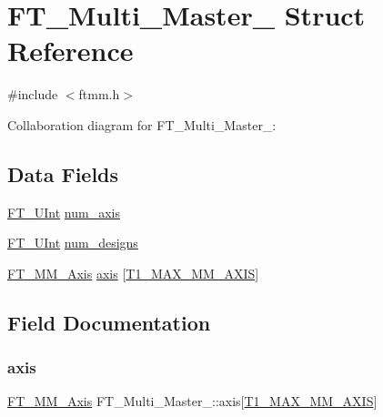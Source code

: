 \hypertarget{struct_f_t___multi___master__}{}\section{F\+T\+\_\+\+Multi\+\_\+\+Master\+\_\+ Struct Reference}
\label{struct_f_t___multi___master__}


{\ttfamily \#include $<$ftmm.\+h$>$}



Collaboration diagram for F\+T\+\_\+\+Multi\+\_\+\+Master\+\_\+\+:
\subsection*{Data Fields}
\begin{DoxyCompactItemize}
\item 
\hyperlink{fttypes_8h_abcb8db4dbf35d2b55a9e8c7b0926dc52}{F\+T\+\_\+\+U\+Int} \hyperlink{struct_f_t___multi___master___a90a0ace4e40b91912259ad52fc86fb6f}{num\+\_\+axis}
\item 
\hyperlink{fttypes_8h_abcb8db4dbf35d2b55a9e8c7b0926dc52}{F\+T\+\_\+\+U\+Int} \hyperlink{struct_f_t___multi___master___a78b797ee560f4b00795a7dce9656178d}{num\+\_\+designs}
\item 
\hyperlink{ftmm_8h_a3af0f0b8fec16073eb9795eb69a645ee}{F\+T\+\_\+\+M\+M\+\_\+\+Axis} \hyperlink{struct_f_t___multi___master___a1eb062ff3b5ac245ab9421a46b349818}{axis} \mbox{[}\hyperlink{t1tables_8h_a471108ae668a65363dd36bb17e1ecbbe}{T1\+\_\+\+M\+A\+X\+\_\+\+M\+M\+\_\+\+A\+X\+IS}\mbox{]}
\end{DoxyCompactItemize}


\subsection{Field Documentation}
\mbox{\label{struct_f_t___multi___master___a1eb062ff3b5ac245ab9421a46b349818}} 
\subsubsection{\texorpdfstring{axis}{axis}}
{\footnotesize\ttfamily \hyperlink{ftmm_8h_a3af0f0b8fec16073eb9795eb69a645ee}{F\+T\+\_\+\+M\+M\+\_\+\+Axis} F\+T\+\_\+\+Multi\+\_\+\+Master\+\_\+\+::axis\mbox{[}\hyperlink{t1tables_8h_a471108ae668a65363dd36bb17e1ecbbe}{T1\+\_\+\+M\+A\+X\+\_\+\+M\+M\+\_\+\+A\+X\+IS}\mbox{]}}

